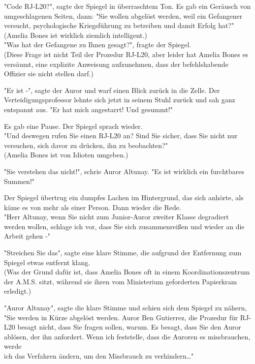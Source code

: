 {"Code RJ-L20?", sagte der Spiegel in überraschtem Ton. Es gab ein Geräusch von umgeschlagenen Seiten, dann: "Sie wollen abgelöst werden, weil ein Gefangener versucht, psychologische Kriegsführung zu betreiben und damit Erfolg hat?"\\ (Amelia Bones ist wirklich ziemlich intelligent.)\\ "Was hat der Gefangene zu Ihnen gesagt?", fragte der Spiegel.\\ (Diese Frage ist nicht Teil der Prozedur RJ-L20, aber leider hat Amelia Bones es versäumt, eine explizite Anweisung aufzunehmen, dass der befehlshabende Offizier sie nicht stellen darf.)

"Er ist -", sagte der Auror und warf einen Blick zurück in die Zelle. Der Verteidigungsprofessor lehnte sich jetzt in seinem Stuhl zurück und sah ganz entspannt aus. "Er hat mich angestarrt! Und gesummt!"

Es gab eine Pause. Der Spiegel sprach wieder.\\ "Und deswegen rufen Sie einen RJ-L20 an? Sind Sie sicher, dass Sie nicht nur versuchen, sich davor zu drücken, ihn zu beobachten?"\\ (Amelia Bones ist von Idioten umgeben.)

"Sie verstehen das nicht!", schrie Auror Altunay. "Es ist wirklich ein furchtbares Summen!"

Der Spiegel übertrug ein dumpfes Lachen im Hintergrund, das sich anhörte, als käme es von mehr als einer Person. Dann wieder die Rede.\\ "Herr Altunay, wenn Sie nicht zum Junior-Auror zweiter Klasse degradiert werden wollen, schlage ich vor, dass Sie sich zusammenreißen und wieder an die Arbeit gehen -"

"Streichen Sie das", sagte eine klare Stimme, die aufgrund der Entfernung zum Spiegel etwas entfernt klang.\\ (Was der Grund dafür ist, dass Amelia Bones oft in einem Koordinationszentrum der A.M.S. sitzt, während sie ihren vom Ministerium geforderten Papierkram erledigt.)

"Auror Altunay", sagte die klare Stimme und schien sich dem Spiegel zu nähern, "Sie werden in Kürze abgelöst werden. Auror Ben Gutierrez, die Prozedur für RJ-L20 besagt nicht, dass Sie fragen sollen, warum. Es besagt, dass Sie den Auror ablösen, der ihn anfordert. Wenn ich feststelle, dass die Auroren es missbrauchen, werde\\ ich das Verfahren ändern, um den Missbrauch zu verhindern…"

}
